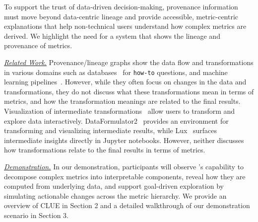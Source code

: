 To support the trust of data-driven decision-making, provenance information must
move beyond data-centric lineage and provide accessible, metric-centric
explanations that help non-technical users understand how complex metrics are
derived. We highlight the need for a system that shows the lineage and provenance of
metrics.

\smallskip \noindent \emph{\underline{Related Work.}} 
Provenance/lineage graphs show the data flow and transformations in various
domains such as databases~\cite{DBLP:conf/sigmod/MeliouS12,galhotra2022hyper}
for \texttt{how-to} questions, and machine learning
pipelines~\cite{DBLP:conf/deem/PinaCK0M24, DBLP:journals/tods/ChapmanLMT24}.
However, while they often focus on changes in the data and transformations, they
do not discuss what these transformations mean in terms of metrics, and how the
transformation meanings are related to the final results. 
Visualization of intermediate
transformations~\cite{DBLP:journals/pvldb/LeeTABCKMSYHP21,
DBLP:conf/chi/WangLDM025} allow users to transform and explore data
interactively. DataFormulator2~\cite{DBLP:conf/chi/WangLDM025} provides an
environment for transforming and visualizing intermediate results, while
Lux~\cite{DBLP:journals/pvldb/LeeTABCKMSYHP21} surfaces intermediate insights
directly in Jupyter notebooks. However, neither discusses how transformations
relate to the final results in terms of metrics.

\smallskip \noindent \emph{\underline{Demonstration.}} In our demonstration,
participants will observe \clue's capability to decompose complex metrics into
interpretable components, reveal how they are computed from underlying data, and
support goal-driven exploration by simulating actionable changes across the
metric hierarchy. We provide an overview of CLUE in Section 2 and a detailed
walkthrough of our demonstration scenario in Section 3. 